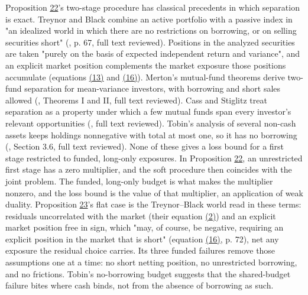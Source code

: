 \documentclass[11pt]{article}
\begin{document}
Proposition \hyperref[res:Proposition-22]{22}'s two-stage procedure has classical precedents in
which separation is exact. Treynor and Black combine an active
portfolio with a passive index in "an idealized world in which there
are no restrictions on borrowing, or on selling securities short"
(\cite{treynor1973security}, p. 67, full text reviewed). Positions in
the analyzed securities are taken "purely on the basis of expected
independent return and variance", and an explicit market position
complements the market exposure those positions accumulate
(equations \hyperref[eq:13]{(13)} and \hyperref[eq:16]{(16)}). Merton's mutual-fund
theorems derive two-fund separation for mean-variance investors,
with borrowing and short sales allowed (\cite{merton1972analytic},
Theorems I and II, full text reviewed). Cass and Stiglitz treat
separation as a property under which a few mutual funds span every
investor's relevant opportunities (\cite{cass1970structure}, full text
reviewed). Tobin's analysis of several non-cash assets keeps holdings
nonnegative with total at most one, so it has no borrowing
(\cite{tobin1958liquidity}, Section 3.6, full text reviewed). None of
these gives a loss bound for a first stage restricted to funded,
long-only exposures. In Proposition \hyperref[res:Proposition-22]{22}, an unrestricted first stage
has a zero multiplier, and the soft procedure then coincides with the
joint problem. The funded, long-only budget is what makes the
multiplier nonzero, and the loss bound is the value of that
multiplier, an application of weak duality. Proposition \hyperref[res:Proposition-23]{23}'s flat
case is the Treynor--Black world read in these terms: residuals
uncorrelated with the market (their equation \hyperref[eq:2]{(2)}) and an explicit
market position free in sign, which "may, of course, be negative,
requiring an explicit position in the market that is short"
(equation \hyperref[eq:16]{(16)}, p. 72), net any exposure the residual choice
carries. Its three funded failures remove those assumptions one at
a time: no short netting position, no unrestricted borrowing, and
no frictions. Tobin's no-borrowing budget suggests that the
shared-budget failure bites where cash binds, not from the absence
of borrowing as such.
\end{document}
